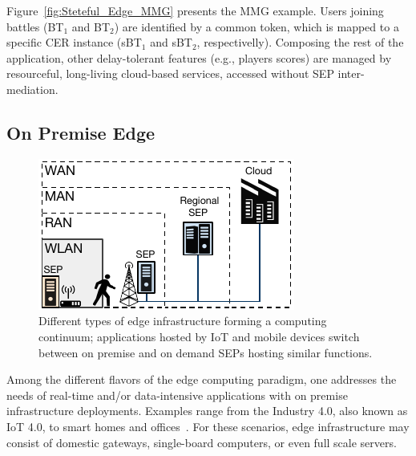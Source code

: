 


Figure~\ref{fig:Steteful_Edge_MMG} presents the MMG example. Users joining battles (BT$_1$ and BT$_2$) are identified by a common token, which is mapped to a specific CER instance (sBT$_1$ and sBT$_2$, respectivelly).
Composing the rest of the application, other delay-tolerant features (e.g., players scores) are managed by resourceful, long-living cloud-based services, accessed without SEP inter-mediation.  %

\subsection{On Premise Edge}

\begin{figure}[tbp]
	\centering
	\includegraphics[width=1\linewidth]{Figs/Edge_Cloud_Continuum}
	\caption{Different types of edge infrastructure forming a computing continuum; applications hosted by IoT and mobile devices switch between on premise and on demand SEPs hosting similar functions.}
	\label{fig:Edge_Cloud_Continuum}
\end{figure}

Among the 
different flavors of the edge computing paradigm, one addresses the needs of real-time and/or data-intensive applications with on premise infrastructure deployments. Examples range from the Industry 4.0, also known as IoT 4.0, to
smart homes and offices~\cite{Porambage:2018}. For these scenarios, edge infrastructure may consist of domestic gateways, single-board computers, or even full scale servers.

